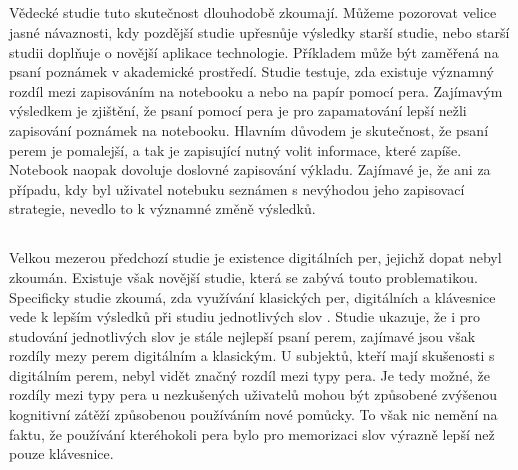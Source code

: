 \documentclass[journal]{IEEEtran}
\begin{document}
\subsection{}
Vědecké studie tuto skutečnost dlouhodobě zkoumají.
Můžeme pozorovat velice jasné návaznosti, kdy pozdější studie upřesnůje výsledky starší studie, nebo starší studii doplňuje o novější aplikace technologie.
Příkladem může být zaměřená na psaní poznámek v akademické prostředí\cite{mightier_pen}. Studie testuje, zda existuje významný rozdíl mezi zapisováním na notebooku a nebo na papír pomocí pera.
Zajímavým výsledkem je zjištění, že psaní pomocí pera je pro zapamatování lepší nežli zapisování poznámek na notebooku.
Hlavním důvodem je skutečnost, že psaní perem je pomalejší, a tak je zapisující nutný volit informace, které zapíše.
Notebook naopak dovoluje doslovné zapisování výkladu.
Zajímavé je, že ani za případu, kdy byl uživatel notebuku seznámen s nevýhodou jeho zapisovací strategie, nevedlo to k významné změně výsledků.

\subsection{}
Velkou mezerou předchozí studie je existence digitálních per, jejichž dopat nebyl zkoumán.
Existuje však novější studie, která se zabývá touto problematikou.
Specificky studie zkoumá, zda využívání klasických per, digitálních a klávesnice vede k lepším výsledků při studiu jednotlivých slov
\cite{advantage_of_handwriting}.
Studie ukazuje, že i pro studování jednotlivých slov je stále nejlepší psaní perem, zajímavé jsou však rozdíly mezy perem digitálním a klasickým.
U subjektů, kteří mají skušenosti s digitálním perem, nebyl vidět značný rozdíl mezi typy pera.
Je tedy možné, že rozdíly mezi typy pera u nezkušených uživatelů mohou být způsobené zvýšenou kognitivní zátěží způsobenou používáním nové pomůcky. To však nic nemění na faktu, že používání kteréhokoli pera bylo pro memorizaci slov výrazně lepší než pouze klávesnice.
\end{document}
